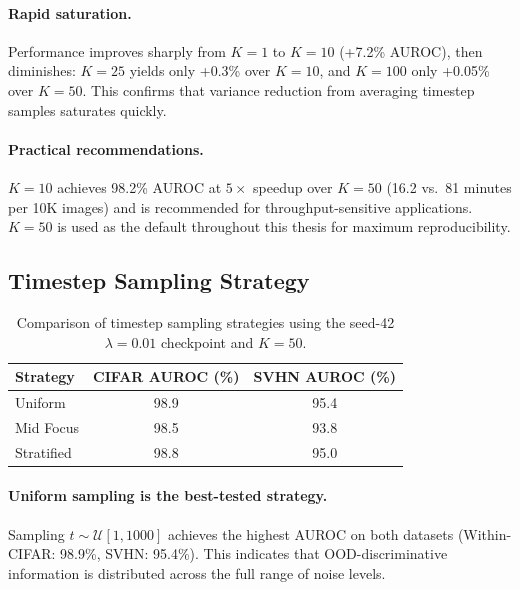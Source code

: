 \paragraph{Rapid saturation.}
Performance improves sharply from $K = 1$ to $K = 10$ (+7.2\% AUROC),
then diminishes: $K = 25$ yields only +0.3\% over $K = 10$, and
$K = 100$ only +0.05\% over $K = 50$.
This confirms that variance reduction from averaging timestep samples
saturates quickly.

\paragraph{Practical recommendations.}
$K = 10$ achieves 98.2\% AUROC at $5\times$ speedup over $K = 50$
(16.2 vs.\ 81 minutes per 10K images) and is recommended for
throughput-sensitive applications.
$K = 50$ is used as the default throughout this thesis for maximum
reproducibility.

\subsection{Timestep Sampling Strategy}
\label{sec:results:ablations:timestep}

\begin{table}[htbp]
  \centering
  \caption{Comparison of timestep sampling strategies using the seed-42
    $\lambda{=}0.01$ checkpoint and $K{=}50$.}
  \label{tab:results:timestep-strategies}
  \begin{tabular}{lcc}
    \toprule
    Strategy & CIFAR AUROC (\%) & SVHN AUROC (\%) \\
    \midrule
    Uniform   & 98.9 & 95.4 \\
    Mid Focus & 98.5 & 93.8 \\
    Stratified & 98.8 & 95.0 \\
    \bottomrule
  \end{tabular}
\end{table}

\paragraph{Uniform sampling is the best-tested strategy.}
Sampling $t \sim \mathcal{U}[1, 1000]$ achieves the highest AUROC on
both datasets (Within-CIFAR: 98.9\%, SVHN: 95.4\%).
This indicates that OOD-discriminative information is distributed across
the full range of noise levels.

